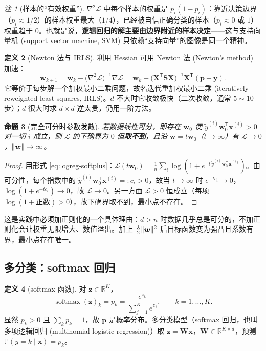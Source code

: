 \documentclass[UTF8,a4paper,11pt]{ctexart}
\theoremstyle{definition}
\newtheorem{definition}{定义}[section]
\theoremstyle{plain}
\newtheorem{proposition}[definition]{命题}
\theoremstyle{remark}
\newtheorem{remark}[definition]{注}
\DeclarePairedDelimiter{\norm}{\lVert}{\rVert}
\DeclareMathOperator{\softmax}{softmax}
\newcommand{\R}{\mathbb{R}}
\newcommand{\Prob}{\mathbb{P}}
\newcommand{\Loss}{\mathcal{L}}
\newcommand{\T}{^{\mathsf{T}}}
\newcommand{\eng}[1]{\textup{(#1)}}
\begin{document}
\begin{remark}[样本的“有效权重”]
$\nabla^2\Loss$ 中每个样本的权重是 $p_i(1-p_i)$：靠近决策边界（$p_i\approx1/2$）的样本权重最大（$1/4$），已经被自信正确分类的样本（$p_i\approx0$ 或 $1$）权重趋于 $0$。也就是说，\textbf{逻辑回归的解主要由边界附近的样本决定}——这与支持向量机 \eng{support vector machine, SVM} 只依赖“支持向量”的图像是同一个精神。
\end{remark}

\begin{definition}[Newton 法与 IRLS]
利用 Hessian 可用 Newton 法 \eng{Newton's method} 加速：
\[
  \bm{w}_{k+1}=\bm{w}_k-\big(\nabla^2\Loss\big)^{-1}\nabla\Loss
  =\bm{w}_k-\big(\bm{X}\T\bm{S}\bm{X}\big)^{-1}\bm{X}\T(\bm{p}-\bm{y}).
\]
它等价于每步解一个加权最小二乘问题，故名迭代重加权最小二乘 \eng{iteratively reweighted least squares, IRLS}。$d$ 不大时它收敛极快（二次收敛，通常 $5\sim10$ 步）；$d$ 很大时求 $d\times d$ 逆太贵，仍用一阶方法。
\end{definition}

\begin{proposition}[完全可分时参数发散]\label{prop:separable}
若数据线性可分，即存在 $\bm{w}_0$ 使 $\tilde y^{(i)}\bm{w}_0\T\bm{x}^{(i)}>0$ 对一切 $i$ 成立，则 $\Loss$ 的下确界为 $0$ 但\textbf{取不到}，且沿 $\bm{w}=t\bm{w}_0$（$t\to\infty$）有 $\Loss\to0$，$\norm{\bm{w}}\to\infty$。
\end{proposition}

\begin{proof}
用形式 \eqref{eq:logreg-softplus}：$\Loss(t\bm{w}_0)=\frac1n\sum_i\log(1+e^{-t\,\tilde y^{(i)}\bm{w}_0\T\bm{x}^{(i)}})$。由可分性，每个指数中的 $\tilde y^{(i)}\bm{w}_0\T\bm{x}^{(i)}=:c_i>0$，故当 $t\to\infty$ 时 $e^{-tc_i}\to0$，$\log(1+e^{-tc_i})\to0$，故 $\Loss\to0$。另一方面 $\Loss>0$ 恒成立（每项 $\log(1+\text{正数})>0$），故下确界取不到，最小点不存在。
\end{proof}

这是实践中必须加正则化的一个具体理由：$d>n$ 时数据几乎总是可分的，不加正则化会让权重无限增大、数值溢出。加上 $\frac{\lambda}{2}\norm{\bm{w}}^2$ 后目标函数变为强凸且系数有界，最小点存在唯一。

\subsection{多分类：softmax 回归}

\begin{definition}[softmax 函数]\label{def:softmax}
对 $\bm{z}\in\R^K$，
\[
  \softmax(\bm{z})_k=p_k=\frac{e^{z_k}}{\sum_{j=1}^{K}e^{z_j}},\qquad k=1,\dots,K .
\]
显然 $p_k>0$ 且 $\sum_kp_k=1$，故 $\bm{p}$ 是概率分布。多分类模型（softmax 回归，也叫多项逻辑回归 \eng{multinomial logistic regression}）取 $\bm{z}=\bm{W}\bm{x}$，$\bm{W}\in\R^{K\times d}$，预测 $\Prob(y=k\mid\bm{x})=p_k$。
\end{definition}
\end{document}
